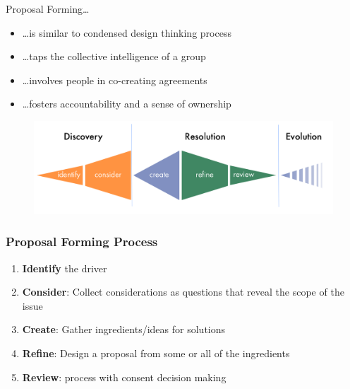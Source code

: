 Proposal Forming{\ldots}

\begin{itemize}
\item {\ldots}is similar to condensed design thinking process

\item {\ldots}taps the collective intelligence of a group

\item {\ldots}involves people in co-creating agreements

\item {\ldots}fosters accountability and a sense of ownership

\end{itemize}

\begin{figure}[htbp]
\centering
\includegraphics[keepaspectratio,width=\textwidth,height=0.75\textheight]{img/proposal-forming/proposal-forming.png}
\end{figure}

\subsubsection{Proposal Forming Process}
\label{proposalformingprocess}

\begin{enumerate}
\item \textbf{Identify} the driver

\item \textbf{Consider}: Collect considerations as questions that reveal the scope of the issue

\item \textbf{Create}: Gather ingredients\slash ideas for solutions

\item \textbf{Refine}: Design a proposal from some or all of the ingredients

\item \textbf{Review}: process with consent decision making

\end{enumerate}

